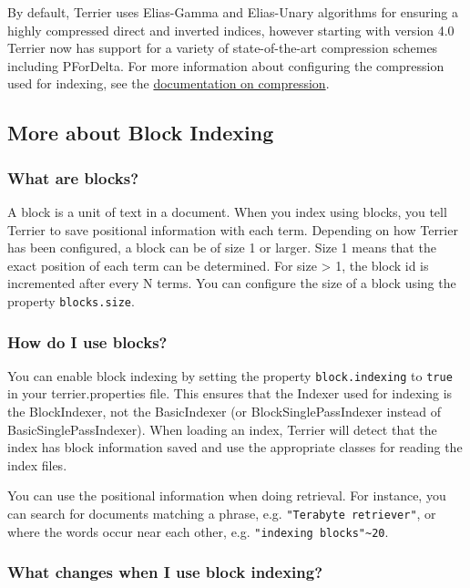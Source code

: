 By default, Terrier uses Elias-Gamma and Elias-Unary algorithms for
ensuring a highly compressed direct and inverted indices, however
starting with version 4.0 Terrier now has support for a variety of
state-of-the-art compression schemes including PForDelta. For more
information about configuring the compression used for indexing, see the
\href{compression.html}{documentation on compression}.

\subsection{More about Block Indexing}\label{more-about-block-indexing}

\subsubsection{What are blocks?}\label{what-are-blocks}

A block is a unit of text in a document. When you index using blocks,
you tell Terrier to save positional information with each term.
Depending on how Terrier has been configured, a block can be of size 1
or larger. Size 1 means that the exact position of each term can be
determined. For size \textgreater{} 1, the block id is incremented after
every N terms. You can configure the size of a block using the property
\texttt{blocks.size}.

\subsubsection{How do I use blocks?}\label{how-do-i-use-blocks}

You can enable block indexing by setting the property
\texttt{block.indexing} to \texttt{true} in your terrier.properties
file. This ensures that the Indexer used for indexing is the
BlockIndexer, not the BasicIndexer (or BlockSinglePassIndexer instead of
BasicSinglePassIndexer). When loading an index, Terrier will detect that
the index has block information saved and use the appropriate classes
for reading the index files.

You can use the positional information when doing retrieval. For
instance, you can search for documents matching a phrase, e.g.
\texttt{"Terabyte\ retriever"}, or where the words occur near each
other, e.g. \texttt{"indexing\ blocks"\textasciitilde{}20}.

\subsubsection{What changes when I use block
indexing?}\label{what-changes-when-i-use-block-indexing}

